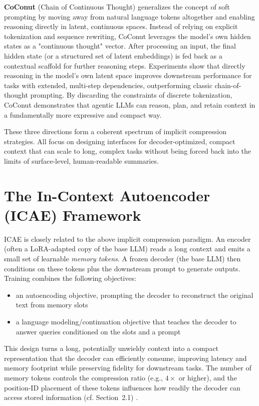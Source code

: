 \textbf{CoConut} (Chain of Continuous Thought) \cite{coconut_placeholder,arxiv_2412_06769} generalizes the concept of soft prompting by moving away from natural language tokens altogether and enabling reasoning directly in latent, continuous spaces.
Instead of relying on explicit tokenization and sequence rewriting, CoConut leverages the model's own hidden states as a "continuous thought" vector.
After processing an input, the final hidden state (or a structured set of latent embeddings) is fed back as a contextual scaffold for further reasoning steps.
Experiments show that directly reasoning in the model's own latent space improves downstream performance for tasks with extended, multi-step dependencies, outperforming classic chain-of-thought prompting.
By discarding the constraints of discrete tokenization, CoConut demonstrates that agentic LLMs can reason, plan, and retain context in a fundamentally more expressive and compact way.

These three directions form a coherent spectrum of implicit compression strategies.
All focus on designing interfaces for decoder-optimized, compact context that can scale to long, complex tasks without being forced back into the limits of surface-level, human-readable summaries.


\section{The In-Context Autoencoder (ICAE) Framework}

ICAE \cite{ge_-context_2024} is closely related to the above implicit compression paradigm.
An encoder (often a LoRA-adapted copy of the base LLM) reads a long context and emits a small set of learnable \emph{memory tokens}.
A frozen decoder (the base LLM) then conditions on these tokens plus the downstream prompt to generate outputs.
Training combines the following objectives:
\begin{itemize}
  \item an autoencoding objective, prompting the decoder to reconstruct the original text from memory slots
  \item a language modeling/continuation objective that teaches the decoder to answer queries conditioned on the slots and a prompt
\end{itemize}
This design turns a long, potentially unwieldy context into a compact representation that the decoder can efficiently consume, improving latency and memory footprint while preserving fidelity for downstream tasks. 
The number of memory tokens controls the compression ratio (e.g., $4\times$ or higher), and the position-ID placement of these tokens influences how readily the decoder can access stored information (cf. Section~2.1) \cite{ge_-context_2024}.


